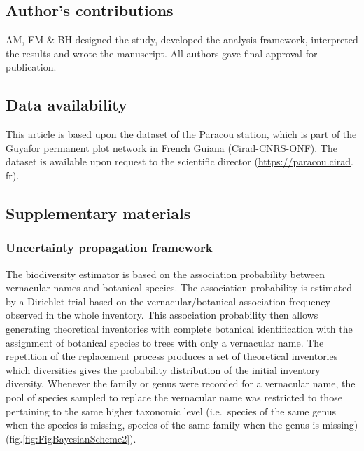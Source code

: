 \documentclass[
  11pt,
  french,
  A4paper,
  extrafontsizes,onecolumn,openright
  ]{memoir}
\begin{document}
\subsection{Author's contributions}\label{authors-contributions}

AM, EM \& BH designed the study, developed the analysis framework,
interpreted the results and wrote the manuscript. All authors gave final
approval for publication.

\subsection{Data availability}\label{data-availability}

This article is based upon the dataset of the Paracou station, which is
part of the Guyafor permanent plot network in French Guiana
(Cirad-CNRS-ONF). The dataset is available upon request to the
scientific director (\url{https://paracou.cirad}. fr).

\newpage

\subsection{Supplementary materials}\label{supplementary-materials}

\subsubsection{Uncertainty propagation
framework}\label{uncertainty-propagation-framework}

The biodiversity estimator is based on the association probability
between vernacular names and botanical species. The association
probability is estimated by a Dirichlet trial based on the
vernacular/botanical association frequency observed in the whole
inventory. This association probability then allows generating
theoretical inventories with complete botanical identification with the
assignment of botanical species to trees with only a vernacular name.
The repetition of the replacement process produces a set of theoretical
inventories which diversities gives the probability distribution of the
initial inventory diversity. Whenever the family or genus were recorded
for a vernacular name, the pool of species sampled to replace the
vernacular name was restricted to those pertaining to the same higher
taxonomic level (i.e.~species of the same genus when the species is
missing, species of the same family when the genus is missing)
(fig.\ref{fig:FigBayesianScheme2}).
\end{document}
